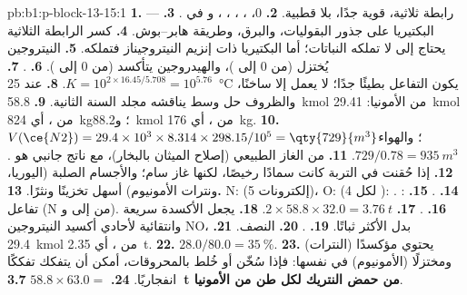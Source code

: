 \begin{solution}{pb:b1:p-block-13-15:1}
\textbf{1.}  --- رابطة ثلاثية، قوية جدًا، بلا قطبية.
\textbf{2.} 0، ، ، ، ، و في .
\textbf{3.} البكتيريا على جذور البقوليات، والبرق، وطريقة
هابر--بوش.
\textbf{4.} كسر الرابطة الثلاثية يحتاج إلى  لا تملكه النباتات؛
أما البكتيريا ذات إنزيم النيتروجيناز فتملكه.
\textbf{5.} النيتروجين يُختزل (من 0 إلى )، والهيدروجين يتأكسد (من 0 إلى ).
\textbf{6.} .
\textbf{7.} $K = 10^{2 \times 16.45/5.708} = 10^{5.76}$.
\textbf{8.} عند \qty{25}{\celsius} يكون التفاعل بطيئًا جدًا؛ 
لا يعمل إلا ساخنًا، والظروف حل وسط يناقشه
مجلد السنة الثانية.
\textbf{9.} \qty{58.8}{kmol} من الأمونيا: \qty{29.41}{kmol} من ،
أي \qty{824}{kg}؛ و\qty{88.2}{kmol} من ، أي \qty{176}{kg}.
\textbf{10.} $V(\ce{N2}) = 29.4 \times 10^3 \times 8.314 \times 298.15/10^5 =
\qty{729}{m^3}$؛ والهواء $729/0.78 = \qty{935}{m^3}$.
\textbf{11.} من الغاز الطبيعي (إصلاح الميثان بالبخار)، مع
ناتج جانبي هو .
\textbf{12.} إذا حُقنت في التربة كانت سمادًا رخيصًا، لكنها غاز
سام؛ والأجسام الصلبة (اليوريا، ونترات الأمونيوم) أسهل تخزينًا ونثرًا.
\textbf{13.} N:  (5 إلكترونات)، O:  (4 لكل
): .
\textbf{14.} .
\textbf{15.} : تفاعل  (N من  إلى
 و).
\textbf{16.} .
\textbf{17.} $2 \times 58.8 \times 32.0 = \qty{3.76}{t}$.
\textbf{18.} يجعل الأكسدة سريعة وانتقائية لأحادي أكسيد النيتروجين NO، بدل
 الأكثر ثباتًا.
\textbf{19.} .
\textbf{20.} النصف.
\textbf{21.} \qty{29.4}{kmol} من ، أي \qty{2.35}{t}.
\textbf{22.} $28.0/80.0 = \qty{35}{\percent}$.
\textbf{23.} يحتوي مؤكسدًا (النترات) ومختزلًا (الأمونيوم) في
 نفسها: فإذا سُخّن أو خُلط بالمحروقات، أمكن أن يتفكك تفككًا انفجاريًا.
\textbf{24.} $58.8 \times 63.0 =$ \textbf{\qty{3.7}{t} من حمض النتريك لكل طن
من الأمونيا}.
\end{solution}
